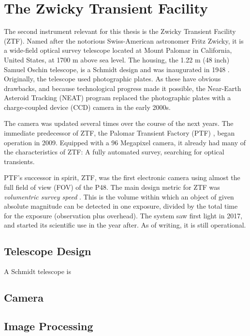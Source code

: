 \setchapterpreamble[u]{\margintoc}
\chapter{The Zwicky Transient Facility}
The second instrument relevant for this thesis is the Zwicky Transient Facility (ZTF). Named after the notorious Swiss-American astronomer Fritz Zwicky, it is a wide-field optical survey telescope located at Mount Palomar in California, United States, at 1700 m above sea level. The housing, the 1.22 m (48 inch) Samuel Oschin telescope, is a Schmidt design and was inaugurated in 1948 \cite{Harrington1952}. Originally, the telescope used photographic plates. As these have obvious drawbacks, and because technological progress made it possible, the Near-Earth Asteroid Tracking (NEAT) program \cite{Pravdo1999} replaced the photographic plates with a charge-coupled device (CCD) camera in the early 2000s.

The camera was updated several times over the course of the next years. The immediate predecessor of ZTF, the Palomar Transient Factory (PTF) \cite{Law2009}, began operation in 2009. Equipped with a 96 Megapixel camera, it already had many of the characteristics of ZTF: A fully automated survey, searching for optical transients.

PTF's successor in spirit, ZTF, was the first electronic camera using almost the full field of view (FOV) of the P48. The main design metric for ZTF was \textit{volumentric survey speed} \cite{Bellm2016}. This is the volume within which an object of given absolute magnitude can be detected in one exposure, divided by the total time for the exposure (observation plus overhead). The system saw first light in 2017, and started its scientific use in the year after. As of writing, it is still operational.

\section{Telescope Design}
A Schmidt telescope is 

\section{Camera}

\section{Image Processing}